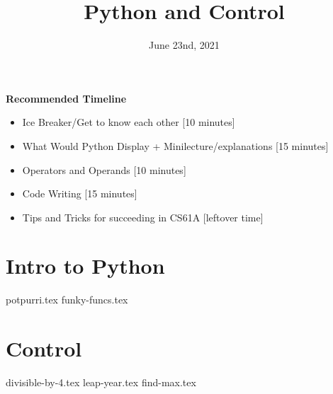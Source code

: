 \documentclass{exam}
\title{Python and Control}
\date{June 23nd, 2021}
\begin{document}
\maketitle
\begin{guide}
\textbf{Recommended Timeline}
\begin{itemize}
  \item Ice Breaker/Get to know each other [10 minutes]
  \item What Would Python Display + Minilecture/explanations [15 minutes]\item Operators and Operands [10 minutes]
  \item Code Writing [15 minutes]
  \item Tips and Tricks for succeeding in CS61A [leftover time]
\end{itemize}
\end{guide}


\section{Intro to Python}
\begin{questions}
{potpurri.tex}
{funky-funcs.tex}
\end{questions}

\section{Control}
\begin{questions}
{divisible-by-4.tex}
{leap-year.tex}
{find-max.tex}
\end{questions}
\end{document}
